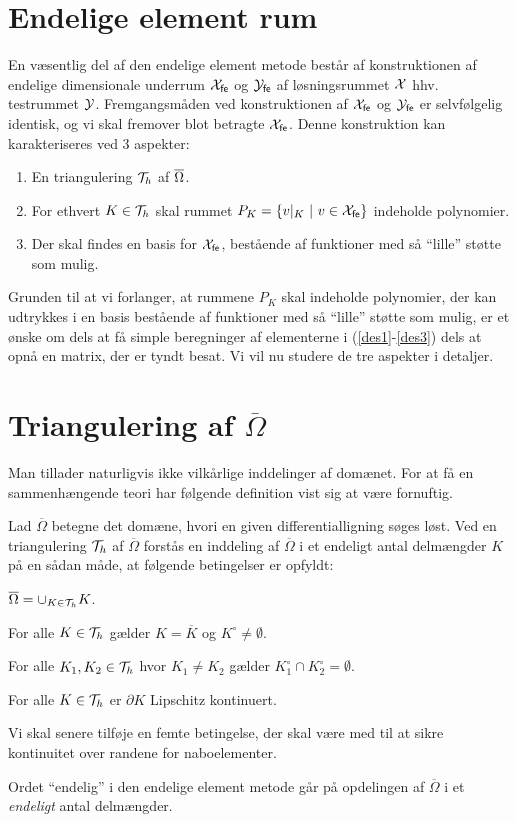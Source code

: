 \section{Endelige element rum} \label{femindledning}
En væsentlig del af den endelige element metode består af
konstruktionen af endelige dimensionale underrum ${\mathcal{X}}_{\mathsf{fe}}$ og ${\mathcal{Y}}_{\mathsf{fe}}$ af
løsningsrummet $\mathcal{X}$ hhv. testrummet $\mathcal{Y}$. Fremgangsmåden ved
konstruktionen af ${\mathcal{X}}_{\mathsf{fe}}$ og ${\mathcal{Y}}_{\mathsf{fe}}$ er selvfølgelig identisk, og vi
skal fremover blot betragte ${\mathcal{X}}_{\mathsf{fe}}$. Denne konstruktion kan
karakteriseres ved 3 aspekter:
\begin{enumerate}
  \item En triangulering ${\cal{T}}_h$ af $\overline{\Omega}$.
  \item For ethvert $K\in {\cal{T}}_h$ skal rummet $P_K=\{v|_K \ |\ v\in {\mathcal{X}}_{\mathsf{fe}}\}$
        indeholde polynomier.
  \item Der skal findes en basis for ${\mathcal{X}}_{\mathsf{fe}}$, bestående af funktioner
        med så ``lille'' støtte som mulig.
\end{enumerate}
Grunden til at vi forlanger, at rummene $P_K$ skal indeholde polynomier, 
der kan udtrykkes i en basis bestående af funktioner med så ``lille'' støtte
som mulig, er et ønske om dels at få simple beregninger af 
elementerne i (\ref{des1}-\ref{des3}) dels at opnå en matrix, der er
tyndt besat. Vi vil nu studere de tre aspekter i detaljer.

\section{Triangulering af $\overline{\Omega}$} \label{triang}
Man tillader naturligvis ikke vilkårlige inddelinger af domænet. For
at få en sammenhængende teori har følgende definition vist sig at være
fornuftig. 

\begin{definition} \label{defth}
Lad $\overline{\Omega}$ betegne det domæne, hvori en given 
differentialligning søges løst. Ved en triangulering ${\cal{T}}_h$ af
$\overline{\Omega}$ forstås en inddeling af $\overline{\Omega}$ i et 
endeligt antal delmængder $K$ på en sådan måde, at følgende betingelser
er opfyldt:
\begin{Thenumerate}
  \item $\overline{\Omega} = \cup_{K\in {\cal{T}}_h} K$.
  \item For alle $K\in {\cal{T}}_h$ gælder $K = \overline{K}$ og 
        $K^{\circ} \not=\emptyset$. 
  \item For alle $K_1, K_2 \in {\cal{T}}_h$ hvor $K_1 \not= K_2$ gælder
        $K_1^\circ \cap K_2^\circ =\emptyset$.
  \item For alle $K \in {\cal{T}}_h$ er $\partial K$ Lipschitz kontinuert. 
\end{Thenumerate}
\end{definition}
Vi skal senere tilføje en femte betingelse, der skal være med til at
sikre kontinuitet over randene for naboelementer.
\begin{remark}
Ordet ``endelig'' i den endelige element metode går på opdeling\-en af
$\overline{\Omega}$ i et {\em endeligt} antal delmængder.
\end{remark}
